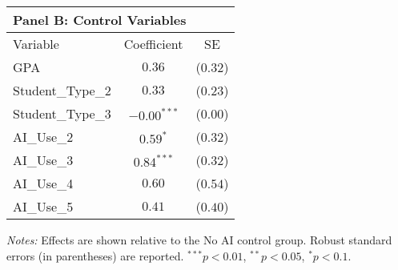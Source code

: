 \begin{table}[!htbp]
\begin{tabular}{lcc}
\multicolumn{3}{l}{\textbf{Panel B: Control Variables}} \\
\hline\hline
Variable & Coefficient & SE \\
\hline
GPA & $0.36$ & ($0.32$) \\
Student_Type_2 & $0.33$ & ($0.23$) \\
Student_Type_3 & $-0.00^{***}$ & ($0.00$) \\
AI_Use_2 & $0.59^{*}$ & ($0.32$) \\
AI_Use_3 & $0.84^{***}$ & ($0.32$) \\
AI_Use_4 & $0.60$ & ($0.54$) \\
AI_Use_5 & $0.41$ & ($0.40$) \\
\hline
\end{tabular}
\begin{tablenotes}
\small
\item \textit{Notes:} Effects are shown relative to the No AI control group. Robust standard errors (in parentheses) are reported. $^{***}p<0.01$, $^{**}p<0.05$, $^{*}p<0.1$.
\end{tablenotes}
\end{table}